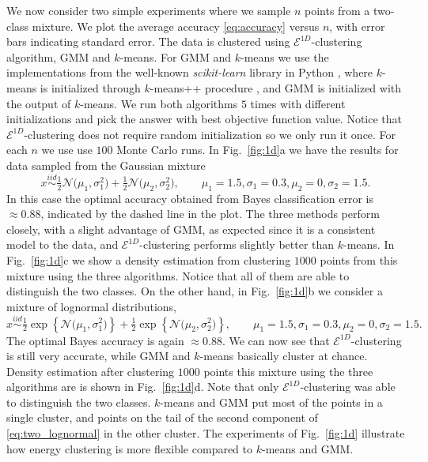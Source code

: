 \documentclass[aps,preprint,nofootinbib,floatfix]{revtex4-1}
\begin{document}
We now consider two simple experiments where we sample $n$ points
from a two-class mixture.
We plot the average accuracy \eqref{eq:accuracy} versus $n$, 
with error bars indicating standard error.
The data is clustered using $\mathcal{E}^{1D}$-clustering algorithm,
GMM and $k$-means. 
For GMM and $k$-means we use the implementations
from the well-known \emph{scikit-learn} library in 
Python \cite{scikit-learn}, where $k$-means is initialized through
$k$-means++ procedure \cite{Vassilvitskii}, and GMM is initialized
with the output of $k$-means. We run both algorithms
$5$ times with different initializations and pick the answer with best 
objective function value.
Notice that $\mathcal{E}^{1D}$-clustering does not require random
initialization so we only run it once.
For each $n$ we use use $100$ Monte Carlo runs.
In  Fig.~\ref{fig:1d}a 
we have the results for data sampled from the Gaussian mixture
\begin{equation}
\label{eq:two_normal}
x \stackrel{iid}{\sim} 
\tfrac{1}{2}\mathcal{N}\big(\mu_1,\sigma_1^2\big) 
+\tfrac{1}{2}\mathcal{N}\big(\mu_2,\sigma_2^2\big), 
\qquad 
\mu_1 = 1.5, 
\sigma_1=0.3, 
\mu_2 = 0, 
\sigma_2 = 1.5.
\end{equation}
In this case the optimal accuracy 
obtained from Bayes classification error
is $ \approx 0.88$, indicated by the dashed line in the plot.
The three methods
perform closely, with a slight advantage of GMM, as expected since
it is a consistent model to the data, and 
$\mathcal{E}^{1D}$-clustering performs slightly better
than $k$-means. 
In Fig.~\ref{fig:1d}c we show a density estimation from clustering
$1000$ points from this mixture using the three algorithms.
Notice that all of them are able to distinguish the two classes.
On the other hand, in Fig.~\ref{fig:1d}b
we consider a mixture of lognormal distributions,
\begin{equation}
\label{eq:two_lognormal}
x \stackrel{iid}{\sim} 
\tfrac{1}{2} \exp\left\{\mathcal{N}\big( \mu_1,\sigma_1^2\big)\right\} 
+\tfrac{1}{2} \exp\left\{\mathcal{N}\big( \mu_2,\sigma_2^2\big)\right\}, 
\qquad 
\mu_1 = 1.5, 
\sigma_1=0.3, 
\mu_2 = 0, 
\sigma_2 = 1.5.
\end{equation}
The optimal Bayes accuracy is again $\approx 0.88$.
We can now see that $\mathcal{E}^{1D}$-clustering
is still  very accurate, while
GMM and $k$-means basically cluster at chance.
Density estimation after clustering $1000$ points this
mixture using the three algorithms 
are
is shown in Fig.~\ref{fig:1d}d. Note that only $\mathcal{E}^{1D}$-clustering
was able to distinguish the two classes. $k$-means and GMM put most of the
points in a single cluster, and points on the tail of the second component
of \eqref{eq:two_lognormal} in the other cluster.
The experiments of Fig.~\ref{fig:1d} illustrate
how energy clustering is more flexible compared to $k$-means and GMM.
\end{document}
